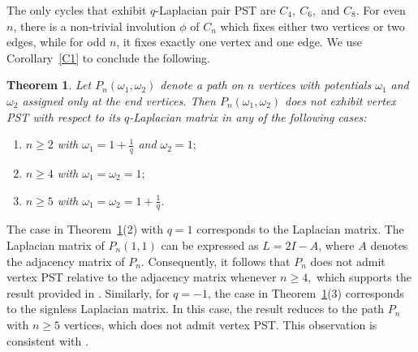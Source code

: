 \documentclass[12pt,a4paper]{article}
\newtheorem{thm}{Theorem}
\begin{document}
The only cycles that exhibit $q$-Laplacian pair PST are $C_4,~C_6,$ and $C_8$. For even $n$, there is a non-trivial involution $\phi$ of $C_n$ which fixes either two vertices or two edges, while for odd $n$, it fixes exactly one vertex and one edge.
We use Corollary~\ref{C1} to conclude the following.
\begin{thm}\label{T10}
 Let $P_n(\omega_1,\omega_2)$ denote a path on $n$ vertices with potentials $\omega_1$ and $\omega_2$ assigned only at the end vertices. Then $P_n(\omega_1,\omega_2)$ does not exhibit vertex PST with respect to its $q$-Laplacian matrix in any of the following cases:
	\begin{enumerate}
		\item $n \ge 2$ with $\omega_1=1+\frac{1}{q}$ and $\omega_2=1;$
		\item $n \geq 4$ with $\omega_1=\omega_2=1;$
		\item $n \geq 5$ with $\omega_1=\omega_2=1+\frac{1}{q}.$
    \end{enumerate}
\end{thm}
The case in Theorem~\ref{T10}(2) with $q=1$ corresponds to the Laplacian matrix. The Laplacian matrix of $P_n(1,1)$ can be expressed as $L = 2I - A$, where $A$ denotes the adjacency matrix of $P_n$. Consequently, it follows that $P_n$ does not admit vertex PST relative to the adjacency matrix whenever $n \geq 4,$ which supports the result provided in \cite{christandl}. Similarly, for $q=-1$, the case in Theorem~\ref{T10}(3) corresponds to the signless Laplacian matrix. In this case, the result reduces to the path $P_n$ with $n \geq 5$ vertices, which does not admit vertex PST. This observation is consistent with \cite[Corollary~5]{alvir}.
\end{document}
